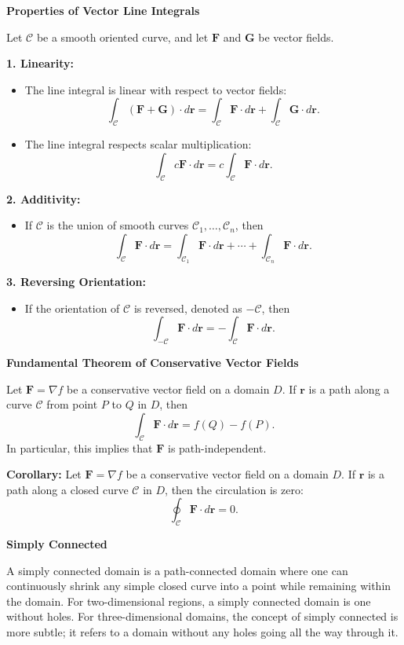 \documentclass{article}
\newenvironment{definition}[1]{
    \par\noindent\textbf{#1}\par\noindent
}{
    \par \vspace{0.5cm}
}
\begin{document}
\begin{definition}{Properties of Vector Line Integrals}
Let \(\mathcal{C}\) be a smooth oriented curve, and let \(\bm{F}\) and \(\bm{G}\) be vector fields.

\textbf{1. Linearity:}
\begin{itemize}
    \item The line integral is linear with respect to vector fields:
    \[ \int_{\mathcal{C}} (\bm{F} + \bm{G}) \cdot d\bm{r} = \int_{\mathcal{C}} \bm{F} \cdot d\bm{r} + \int_{\mathcal{C}} \bm{G} \cdot d\bm{r}. \]
    \item The line integral respects scalar multiplication:
    \[ \int_{\mathcal{C}} c\bm{F} \cdot d\bm{r} = c \int_{\mathcal{C}} \bm{F} \cdot d\bm{r}. \]
\end{itemize}

\textbf{2. Additivity:}
\begin{itemize}
    \item If \(\mathcal{C}\) is the union of smooth curves \(\mathcal{C}_1, \ldots, \mathcal{C}_n\), then
    \[ \int_{\mathcal{C}} \bm{F} \cdot d\bm{r} = \int_{\mathcal{C}_1} \bm{F} \cdot d\bm{r} + \cdots + \int_{\mathcal{C}_n} \bm{F} \cdot d\bm{r}. \]
\end{itemize}

\textbf{3. Reversing Orientation:}
\begin{itemize}
    \item If the orientation of \(\mathcal{C}\) is reversed, denoted as \(-\mathcal{C}\), then
    \[ \int_{-\mathcal{C}} \bm{F} \cdot d\bm{r} = -\int_{\mathcal{C}} \bm{F} \cdot d\bm{r}. \]
\end{itemize}
\end{definition}

\begin{definition}{Fundamental Theorem of Conservative Vector Fields}
Let \(\bm{F} = \nabla f\) be a conservative vector field on a domain \(D\). If \(\bm{r}\) is a path along a curve \(\mathcal{C}\) from point \(P\) to \(Q\) in \(D\), then
\[ \int_{\mathcal{C}} \bm{F} \cdot d\bm{r} = f(Q) - f(P). \]
In particular, this implies that \(\bm{F}\) is path-independent.

\textbf{Corollary:}
Let \(\bm{F} = \nabla f\) be a conservative vector field on a domain \(D\). If \(\bm{r}\) is a path along a closed curve \(\mathcal{C}\) in \(D\), then the circulation is zero:
\[ \oint_{\mathcal{C}} \bm{F} \cdot d\bm{r} = 0. \]
\end{definition}

\begin{definition}{Simply Connected}
A simply connected domain is a path-connected domain where one can continuously shrink any simple closed curve into a point while remaining within the domain. For two-dimensional regions, a simply connected domain is one without holes. For three-dimensional domains, the concept of simply connected is more subtle; it refers to a domain without any holes going all the way through it.
\end{definition}
\end{document}
